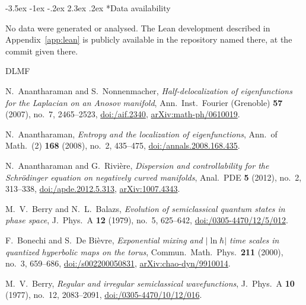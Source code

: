 \documentclass[twoside,10pt]{article}
\makeatletter
\numberwithin{equation}{section}
\theoremstyle{slbody}
\theoremstyle{remark}
\renewcommand{\section}{%
  \@startsection{section}{1}{\z@}%
    {-3.5ex \@plus -1ex \@minus -.2ex}%
    {2.3ex \@plus .2ex}%
    {\normalfont\large\bfseries}}
\makeatother
\begin{document}
\section*{Data availability}
No data were generated or analysed. The Lean development described in Appendix~\ref{app:lean} is publicly available in the
repository named there, at the commit given there.

\begin{thebibliography}{DLMF}

N.~Anantharaman and S.~Nonnenmacher,
\emph{Half-delocalization of eigenfunctions for the Laplacian on an Anosov manifold},
Ann.\ Inst.\ Fourier (Grenoble) \textbf{57} (2007), no.~7, 2465--2523,
\href{https://doi.org/10.5802/aif.2340}{doi:/aif.2340},
\href{https://arxiv.org/abs/math-ph/0610019}{arXiv:math-ph/0610019}.

N.~Anantharaman,
\emph{Entropy and the localization of eigenfunctions},
Ann.\ of Math.\ (2) \textbf{168} (2008), no.~2, 435--475,
\href{https://doi.org/10.4007/annals.2008.168.435}{doi:/annals.2008.168.435}.

N.~Anantharaman and G.~Rivi\`ere,
\emph{Dispersion and controllability for the Schr\"odinger equation on negatively curved manifolds},
Anal.\ PDE \textbf{5} (2012), no.~2, 313--338,
\href{https://doi.org/10.2140/apde.2012.5.313}{doi:/apde.2012.5.313},
\href{https://arxiv.org/abs/1007.4343}{arXiv:1007.4343}.

M.~V.~Berry and N.~L.~Balazs,
\emph{Evolution of semiclassical quantum states in phase space},
J.\ Phys.\ A \textbf{12} (1979), no.~5, 625--642,
\href{https://doi.org/10.1088/0305-4470/12/5/012}{doi:/0305-4470/12/5/012}.

F.~Bonechi and S.~De Bi\`evre,
\emph{Exponential mixing and $|\ln\hbar|$ time scales in quantized hyperbolic
maps on the torus},
Commun.\ Math.\ Phys.\ \textbf{211} (2000), no.~3, 659--686,
\href{https://doi.org/10.1007/s002200050831}{doi:/s002200050831},
\href{https://arxiv.org/abs/chao-dyn/9910014}{arXiv:chao-dyn/9910014}.

M.~V.~Berry,
\emph{Regular and irregular semiclassical wavefunctions},
J.\ Phys.\ A \textbf{10} (1977), no.~12, 2083--2091,
\href{https://doi.org/10.1088/0305-4470/10/12/016}{doi:/0305-4470/10/12/016}.


\end{thebibliography}
\end{document}
